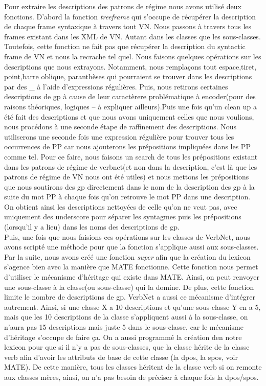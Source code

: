 \documentclass[12pt,maitrise,frenchb,natbib,twoside,initial]{dms}
\numberwithin{equation}{section}
\numberwithin{table}{chapter}
\numberwithin{figure}{chapter}
\begin{document}
Pour extraire les descriptions des patrons de régime nous avons utilisé deux fonctions. D'abord la fonction \emph{treeframe} qui s'occupe de récupérer la description de chaque frame syntaxique à travers tout VN. Nous passons à travers tous les frames existant dans les XML de VN. Autant dans les classes que les sous-classes. Toutefois, cette fonction ne fait pas que récupérer la description du syntactic frame de VN et nous la recrache tel quel. Nous faisons quelques opérations sur les descriptions que nous extrayons. Notamment, nous remplaçons tout espace,tiret, point,barre oblique, paranthèses qui pourraient se trouver dans les descriptions par des {\_} à l'aide d'expressions régulières. Puis, nous retirons certaines descriptions de gp à cause de leur caractèrere problématique à encoder(pour des raisons théoriques, logiques -- à expliquer ailleurs).Puis une fois qu'un clean up a été fait des descriptions et que nous avons uniquement celles que nous voulions, nous procédons à une seconde étape de raffinement des descriptions. Nous utiliserons une seconde fois une expression régulière pour trouver tous les occurrences de PP car nous ajouterons les prépositions impliquées dans les PP comme tel. Pour ce faire, nous faisons un search de tous les prépositions existant dans les patrons de régime de verbnet(et non dans la description, c'est là que les patrons de régime de VN nous ont été utiles) et nous mettons les prépositions que nous soutirons des gp directement dans le nom de la description des gp à la suite du mot PP à chaque fois qu'on retrouve le mot PP dans une description. On obtient ainsi les descriptions nettoyées de celle qu'on ne veut pas, avec uniquement des underscore pour séparer les syntagmes puis les prépositions (lorsqu'il y a lieu) dans les noms des descriptions de gp.
\\[12pt]
Puis, une fois que nous faisions ces opérations sur les classes de VerbNet, nous avons scripté une méthode pour que la fonction s'applique aussi aux sous-classes.
\\[12pt]
Par la suite, nous avons créé une fonction \emph{super} afin que la création du lexicon s'agence bien avec la manière que MATE fonctionne. Cette fonction nous permet d'utiliser le mécanisme d'héritage qui existe dans MATE. Ainsi, on peut renvoyer une sous-classe à la classe(ou sous-classe) qui la domine. De plus, cette fonction limite le nombre de descriptions de gp. VerbNet a aussi ce mécanisme d'intégrer autrement. Ainsi, si une classe X a 10 descriptions et qu'une sous-classe Y en a 5, mais que les 10 descriptions de la classe s'appliquent aussi à la sous-classe, on n'aura pas 15 descriptions mais juste 5 dans le sous-classe, car le mécanisme d'héritage s'occupe de faire ça. On a aussi programmé la création den notre lexicon pour que si il n'y a pas de sous-classes, que la classe hérite de la classe verb afin d'avoir les attributs de base de cette classe (la dpos, la spos, voir MATE). De cette manière, tous les classes héritent de la classe verb si on remonte aux classes mères, ainsi, on n'a pas besoin de préciser à chaque fois la dpos/spos.
\end{document}
